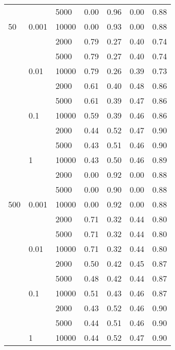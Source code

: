 \begin{tabular}{lllrrrr}
      &       & 5000 &       0.00 &       0.96 &       0.00 &       0.88 \\
50 & 0.001 & 10000 &       0.00 &       0.93 &       0.00 &       0.88 \\
      &       & 2000 &       0.79 &       0.27 &       0.40 &       0.74 \\
      &       & 5000 &       0.79 &       0.27 &       0.40 &       0.74 \\
      & 0.01 & 10000 &       0.79 &       0.26 &       0.39 &       0.73 \\
      &       & 2000 &       0.61 &       0.40 &       0.48 &       0.86 \\
      &       & 5000 &       0.61 &       0.39 &       0.47 &       0.86 \\
      & 0.1 & 10000 &       0.59 &       0.39 &       0.46 &       0.86 \\
      &       & 2000 &       0.44 &       0.52 &       0.47 &       0.90 \\
      &       & 5000 &       0.43 &       0.51 &       0.46 &       0.90 \\
      & 1 & 10000 &       0.43 &       0.50 &       0.46 &       0.89 \\
      &       & 2000 &       0.00 &       0.92 &       0.00 &       0.88 \\
      &       & 5000 &       0.00 &       0.90 &       0.00 &       0.88 \\
500 & 0.001 & 10000 &       0.00 &       0.92 &       0.00 &       0.88 \\
      &       & 2000 &       0.71 &       0.32 &       0.44 &       0.80 \\
      &       & 5000 &       0.71 &       0.32 &       0.44 &       0.80 \\
      & 0.01 & 10000 &       0.71 &       0.32 &       0.44 &       0.80 \\
      &       & 2000 &       0.50 &       0.42 &       0.45 &       0.87 \\
      &       & 5000 &       0.48 &       0.42 &       0.44 &       0.87 \\
      & 0.1 & 10000 &       0.51 &       0.43 &       0.46 &       0.87 \\
      &       & 2000 &       0.43 &       0.52 &       0.46 &       0.90 \\
      &       & 5000 &       0.44 &       0.51 &       0.46 &       0.90 \\
      & 1 & 10000 &       0.44 &       0.52 &       0.47 &       0.90 \\

\end{tabular}
